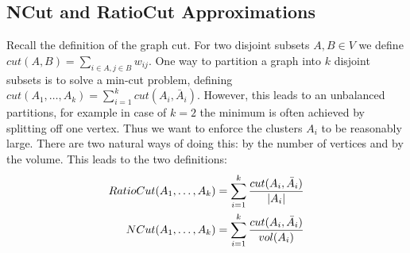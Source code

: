 \subsection{NCut and RatioCut Approximations}

Recall the definition of the graph cut. For two disjoint subsets $A,B\in V$ we define $cut(A,B)=\sum_{i\in A,j\in B}w_{ij}$. One way to partition a graph into $k$ disjoint subsets is to solve a min-cut problem, defining $cut(A_1,\dotsc,A_k)=\sum_{i=1}^kcut(A_i,\bar{A}_i)$. However, this leads to an unbalanced partitions, for example in case of $k=2$ the minimum is often achieved by splitting off one vertex. Thus we want to enforce the clusters $A_i$ to be reasonably large. There are two natural ways of doing this: by the number of vertices and by the volume. This leads to the two definitions:
\begin{align*}
RatioCut(A_1,\dotsc,A_k)&=\sum_{i=1}^k\frac{cut(A_i,\bar{A}_i)}{\left\vert A_i\right\vert} \\
NCut(A_1,\dotsc,A_k)&=\sum_{i=1}^k\frac{cut(A_i,\bar{A}_i)}{vol(A_i)}
\end{align*}

